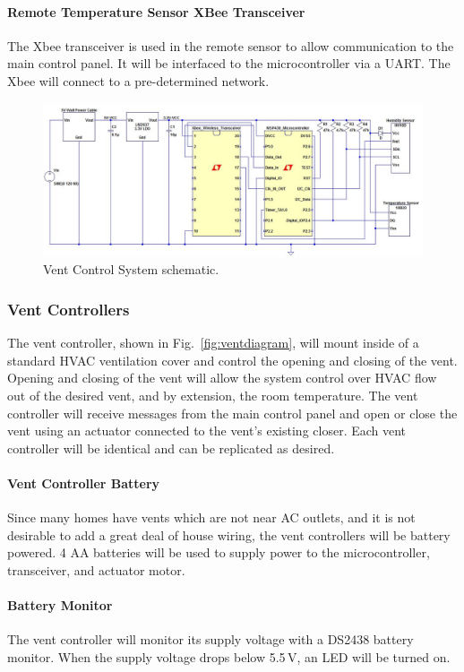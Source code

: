 \paragraph{Remote Temperature Sensor XBee Transceiver}
The Xbee transceiver is used in the remote sensor to allow communication to the main control panel. It will be interfaced to the microcontroller via a UART.  The Xbee will connect to a pre-determined network.

\begin{figure} [htb]
\centering
\includegraphics[width=.99\textwidth]{Vent_System.jpg}
\caption{Vent Control System schematic.}
\label{fig:Vent_System}
\end{figure}

\subsubsection{Vent Controllers}
The vent controller, shown in Fig.~\ref{fig:ventdiagram}, will mount inside of a standard HVAC ventilation cover and control the opening and closing of the vent.  Opening and closing of the vent will allow the system control over HVAC flow out of the desired vent, and by extension, the room temperature. The vent controller will receive messages from the main control panel and open or close the vent using an actuator connected to the vent's existing closer. Each vent controller will be identical and can be replicated as desired.
\paragraph{Vent Controller Battery}
Since many homes have vents which are not near AC outlets, and it is not desirable to add a great deal of house wiring, the vent controllers will be battery powered.  4 AA batteries will be used to supply power to the microcontroller, transceiver, and actuator motor.
\paragraph{Battery Monitor}
The vent controller will monitor its supply voltage with a DS2438 battery monitor.  When the supply voltage drops below 5.5\,V, an LED will be turned on.
